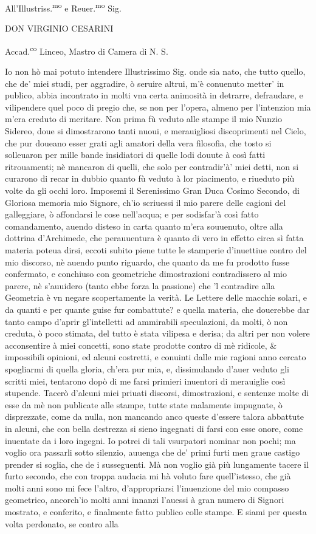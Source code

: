 \documentclass[11pt,twoside,openany]{book}
\begin{document}
All'Illustriss.\textsuperscript{mo} e Reuer.\textsuperscript{mo} Sig.


DON VIRGINIO CESARINI


Accad.\textsuperscript{co} Linceo, Mastro di Camera di N. S.


Io non hò mai potuto intendere Illustrissimo Sig. onde sia nato, che tutto quello, che de' miei studi, per aggradire, ò seruire altrui, m'è conuenuto metter' in publico, abbia incontrato in molti vna certa animosità in detrarre, defraudare, e vilipendere quel poco di pregio che, se non per l'opera, almeno per l'intenzion mia m'era creduto di meritare. Non prima fù veduto alle stampe il mio Nunzio Sidereo, doue si dimostrarono tanti nuoui, e merauigliosi discoprimenti nel Cielo, che pur doueano esser grati agli amatori della vera filosofia, che tosto si solleuaron per mille bande insidiatori di quelle lodi douute à così fatti ritrouamenti; nè mancaron di quelli, che solo per contradir'à' miei detti, non si curarono di recar in dubbio quanto fù veduto à lor piacimento, e riueduto più volte da gli occhi loro. Imposemi il Serenissimo Gran Duca Cosimo Secondo, di Gloriosa memoria mio Signore, ch'io scriuessi il mio parere delle cagioni del galleggiare, ò affondarsi le cose nell'acqua; e per sodisfar'à così fatto comandamento, auendo disteso in carta quanto m'era souuenuto, oltre alla dottrina d'Archimede, che perauuentura è quanto di vero in effetto circa sì fatta materia poteua dirsi, eccoti subito piene tutte le stamperie d'inuettiue contro del mio discorso, nè auendo punto riguardo, che quanto da me fu prodotto fusse confermato, e conchiuso con geometriche dimostrazioni contradissero al mio parere, nè s'auuidero (tanto ebbe forza la passione) che 'l contradire alla Geometria è vn negare scopertamente la verità. Le Lettere delle macchie solari, e da quanti e per quante guise fur combattute? e quella materia, che douerebbe dar tanto campo d'aprir gl'intelletti ad ammirabili speculazioni, da molti, ò non creduta, ò poco stimata, del tutto è stata vilipesa e derisa; da altri per non volere acconsentire à miei concetti, sono state prodotte contro di mè ridicole, \& impossibili opinioni, ed alcuni costretti, e conuinti dalle mie ragioni anno cercato spogliarmi di quella gloria, ch'era pur mia, e, dissimulando d'auer veduto gli scritti miei, tentarono dopò di me farsi primieri inuentori di merauiglie così stupende. Tacerò d'alcuni miei priuati discorsi, dimostrazioni, e sentenze molte di esse da mè non publicate alle stampe, tutte state malamente impugnate, ò disprezzate, come da nulla, non mancando anco queste d'essere talora abbattute in alcuni, che con bella destrezza si sieno ingegnati di farsi con esse onore, come inuentate da i loro ingegni. Io potrei di tali vsurpatori nominar non pochi; ma voglio ora passarli sotto silenzio, auuenga che de' primi furti men graue castigo prender si soglia, che de i susseguenti. Mà non voglio già più lungamente tacere il furto secondo, che con troppa audacia mi hà voluto fare quell'istesso, che già molti anni sono mi fece l'altro, d'appropriarsi l'inuenzione del mio compasso geometrico, ancorch'io molti anni innanzi l'auessi à gran numero di Signori mostrato, e conferito, e finalmente fatto publico colle stampe. E siami per questa volta perdonato, se contro alla 
\end{document}
